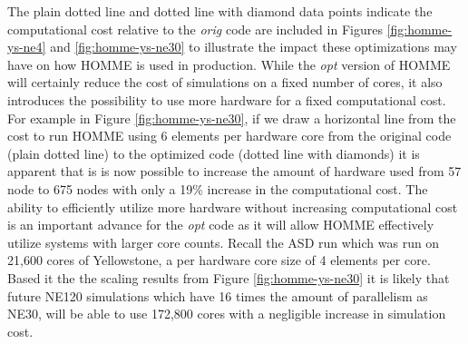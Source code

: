 The plain dotted line and dotted line with diamond data points indicate the computational cost relative to the {\em orig} code are included in Figures \ref{fig:homme-ys-ne4} and \ref{fig:homme-ys-ne30} to illustrate the impact these optimizations may have on how HOMME is used in production.  While the {\em opt} version of HOMME will certainly reduce the cost of simulations on a fixed number of cores, it also introduces the possibility to use more hardware for a fixed computational cost.  For example in Figure \ref{fig:homme-ys-ne30}, if we draw a horizontal line from the cost to run HOMME using 6 elements per hardware core from the original code (plain dotted line) to the optimized code (dotted line with diamonds) it is apparent that is is now possible to increase the amount of hardware used from 57 node to 675 nodes with only a 19\% increase in the computational cost.  The ability to efficiently utilize more hardware without increasing computational cost is an important advance for the {\em opt} code as it will allow HOMME effectively utilize systems with larger core counts.  Recall the ASD run which was run on 21,600 cores of Yellowstone, a per hardware core size of 4 elements per core.  Based it the the scaling results from Figure \ref{fig:homme-ys-ne30} it is likely that future NE120 simulations which have 16 times the amount of parallelism as NE30, will be able to use 172,800 cores with a negligible increase in simulation cost.  


